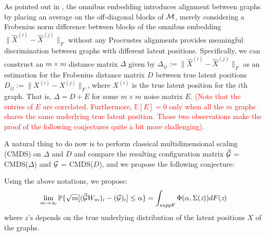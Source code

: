 As pointed out in \cite{OMNI}, the omnibus embedding introduces alignment between graphs by placing an average on the off-diagonal blocks of ${\mathcal{M}}$, merely considering a Frobenius norm difference between blocks of the omnibus embedding 
$\| \hat{X}^{(i)} - \hat{X}^{(j)} \|_{F}$
without any Procrustes alignments provides meaningful discrimination between graphs with different latent positions. Specifically, we can construct an $m \times m$ distance matrix $\Delta$ given by $\Delta_{ij} := \| \hat{X}^{(i)} - \hat{X}^{(j)} \|_{F}$ as an estimation for the Frobenius distance matrix $D$ between true latent positions $ D_{ij} := \| X^{(i)} - X^{(j)} \|_{F}$, where $X^{(i)}$ is the true latent position for the $i$th graph. That is, $\Delta = D + E $ for some $m \times m$ noise matrix $E$. \textcolor{red}{(Note that the entries of $E$ are correlated. Furthermore, $\mathbb{E}[E] = 0$ only when all the $m$ graphs shares the same underlying true latent position. Those two observations make the proof of the following conjectures quite a bit more challenging).}

A natural thing to do now is to perform classical multidimensional scaling (CMDS) on $\Delta$ and $D$ and compare the resulting configuration matrix $\widehat{{\mathcal{G}}}$ = CMDS($\Delta$) and ${\mathcal{G}}$ = CMDS($D$), and we propose the following conjecture:
\begin{Conjecture}
Using the above notations, we propose:
$$ \lim_{m {\to} \infty} \mathbb{P} \{\sqrt{m} [(\widehat{{\mathcal{G}}}W_m)_i - ({\mathcal{G}})_i ]\leq \alpha\} = \int_{supp \textrm{F}} \Phi(\alpha, \Sigma(\emph{z})) dF(\emph{z}) $$ where $z$'s depends on the true underlying distribution of the latent positions $X$ of the graphs.
\end{Conjecture}
